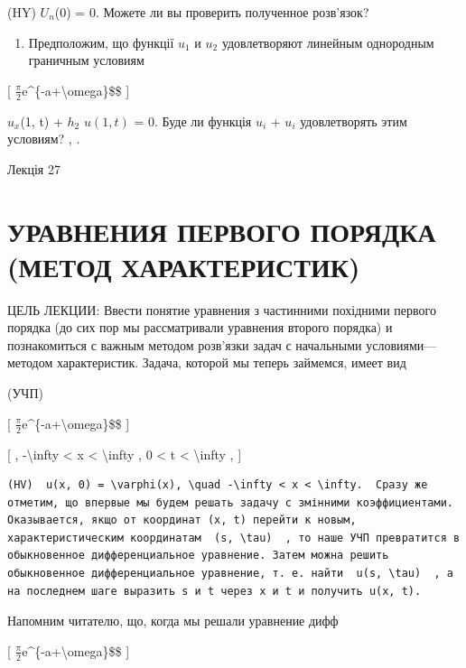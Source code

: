 \documentclass[
]{article}
\providecommand{\tightlist}{%
  \setlength{\itemsep}{0pt}\setlength{\parskip}{0pt}}
\begin{document}
{{(HY) \(U_n\)(0) = 0. Можете ли вы проверить полученное розв'язок?

\begin{enumerate}
\def\labelenumi{\arabic{enumi}.}
\setcounter{enumi}{5}
\tightlist
\item
  Предположим, що функції \(u_1\) и \(u_2\) удовлетворяют линейным
  однородным граничным условиям
\end{enumerate}

{[} \(\frac{\pi}{2}\)e\^{}\{-a+\textbackslash omega\}\$\$ {]}

\(u_x\)(1, t) + \(h_2\) \(u(1, t)\) = 0. Буде ли функція \(u_i\) +
\(u_i\) удовлетворять этим условиям? , .

Лекція 27

\section{УРАВНЕНИЯ ПЕРВОГО ПОРЯДКА (МЕТОД
ХАРАКТЕРИСТИК)}\label{ux443ux440ux430ux432ux43dux435ux43dux438ux44f-ux43fux435ux440ux432ux43eux433ux43e-ux43fux43eux440ux44fux434ux43aux430-ux43cux435ux442ux43eux434-ux445ux430ux440ux430ux43aux442ux435ux440ux438ux441ux442ux438ux43a}

ЦЕЛЬ ЛЕКЦИИ: Ввести понятие уравнения з частинними похідними первого
порядка (до сих пор мы рассматривали уравнения второго порядка) и
познакомиться с важным методом розв'язки задач с начальными
условиями---методом характеристик. Задача, которой мы теперь займемся,
имеет вид

(УЧП)

{[} \(\frac{\pi}{2}\)e\^{}\{-a+\textbackslash omega\}\$\$ {]}

{[} , -\textbackslash infty \textless{} x \textless{}
\textbackslash infty , 0 \textless{} t \textless{} \textbackslash infty
, {]}

\begin{verbatim}
(HV)  u(x, 0) = \varphi(x), \quad -\infty < x < \infty.  Сразу же отметим, що впервые мы будем решать задачу с змінними коэффициентами. Оказывается, якщо от координат (x, t) перейти к новым, характеристическим координатам  (s, \tau)  , то наше УЧП превратится в обыкновенное дифференциальное уравнение. Затем можна решить обыкновенное дифференциальное уравнение, т. е. найти  u(s, \tau)  , а на последнем шаге выразить s и t через x и t и получить u(x, t).
\end{verbatim}

Напомним читателю, що, когда мы решали уравнение дифф

{[} \(\frac{\pi}{2}\)e\^{}\{-a+\textbackslash omega\}\$\$ {]}

}}
\end{document}
